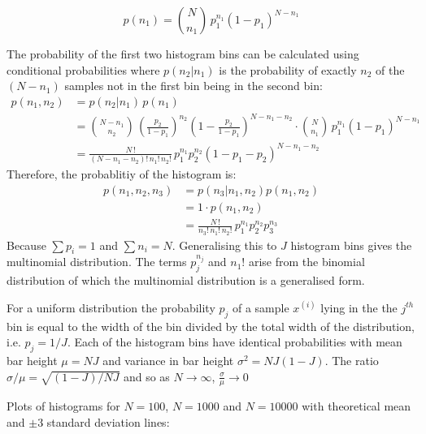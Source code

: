 \documentclass[12pt]{article}
\begin{document}
\begin{equation}
	p(n_1) = \binom {N} {n_1} \, p_1^{n_1} (1-p_1)^{N - n_1}
\end{equation}

The probability of the first two histogram bins can be calculated using conditional probabilities where $p(n_2|n_1)$ is the probability of exactly $n_2$ of the $(N-n_1)$ samples not in the first bin being in the second bin:
\begin{align}
	p(n_1, n_2) &= p(n_2 | n_1) \, p(n_1) \nonumber \\
    			&= \binom {N {-} n_1}{n_2} \, 
                	\left( \frac {p_2} {1 - p_1} \right)^{n_2} 
                	\left( 1 - \frac {p_2} {1-p_1} \right) ^ {N - n_1 - n_2} 
                	\cdot \binom {N}{n_1} \, p_1^{n_1} (1-p_1)^{N - n_1} \nonumber \\
                &= \frac {N\,!} {(N - n_1 - n_2)!\, n_1!\, n_2!} \,
                	p_1^{n_1} p_2^{n_2} (1 - p_1 - p_2)^{N - n_1 - n_2}
\end{align}
Therefore, the probablitiy of the histogram is:
\begin{align}
	p(n_1, n_2, n_3) &= p(n_3 | n_1, n_2) p(n_1, n_2) \nonumber \\
                     &= 1 \cdot p(n_1, n_2) \nonumber \\
                     &= \frac {N\,!} {n_3!\, n_1!\, n_2!} \, p_1^{n_1} p_2^{n_2} p_3^{n_3}
\end{align}
Because $\sum p_i = 1$ and $\sum n_i = N$. Generalising this to $J$ histogram bins gives the multinomial distribution. The terms $p_j^{n_j}$ and $n_1!$ arise from the binomial distribution of which the multinomial distribution is a generalised form. 

For a uniform distribution the probability $p_j$ of a sample  $x^{(i)}$ lying in the the $j^{th}$ bin is equal to the width of the bin divided by the total width of the distribution, i.e.  $p_j = 1/J$. Each of the histogram bins have identical probabilities with mean bar height  $\mu = NJ$ and variance in bar height $\sigma^2 = NJ(1-J)$. The ratio $\sigma / \mu = \sqrt {(1-J) / NJ}$ and so as $N \to \infty$, $\frac \sigma \mu \to 0$

Plots of histograms for $N=100$,  $N=1000$ and $N=10000$ with theoretical mean  and $\pm 3$ standard deviation lines:
\end{document}
